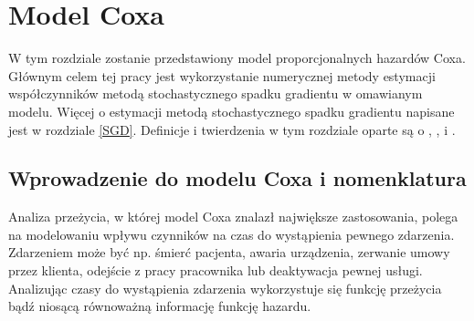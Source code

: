 \chapter{Model Coxa}\label{chap2}
W tym rozdziale zostanie przedstawiony model proporcjonalnych hazardów Coxa. Głównym celem tej pracy jest wykorzystanie numerycznej metody estymacji współczynników metodą stochastycznego spadku gradientu w omawianym modelu. Więcej o estymacji metodą stochastycznego spadku gradientu napisane jest w rozdziale \ref{SGD}. Definicje i twierdzenia w tym rozdziale oparte są o \cite{cox}, \cite{ther}, \cite{assel} i \cite{burzyk1}.



\section{Wprowadzenie do modelu Coxa i nomenklatura}

Analiza przeżycia, w której model Coxa znalazł największe zastosowania, polega na modelowaniu wpływu czynników na czas
do wystąpienia pewnego zdarzenia. Zdarzeniem może być np. śmierć pacjenta, awaria urządzenia, zerwanie umowy przez klienta, odejście z pracy pracownika lub deaktywacja pewnej usługi. Analizując czasy do wystąpienia zdarzenia wykorzystuje się funkcję przeżycia bądź niosącą równoważną informację funkcję hazardu.

